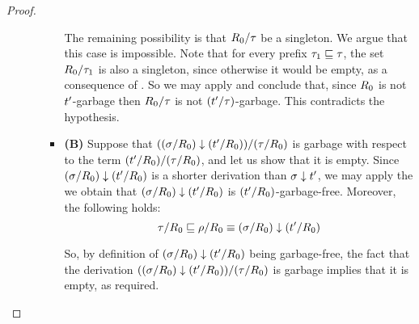 \begin{proof}
\begin{itemize}
\begin{enumerate}
\begin{itemize}
      The remaining possibility is that $R_0/\tau$ be a singleton.
      We argue that this case is impossible.
      Note that for every prefix $\tau_1 \sqsubseteq \tau$,
      the set $R_0/\tau_1$ is also a singleton,
      since otherwise it would be empty, as a consequence of .
      So we may apply  and conclude that,
      since $R_0$ is not $t'$-garbage
      then $R_0/\tau$ is not $(t'/\tau)$-garbage.
      This contradicts the hypothesis.
    \item {\bf (B)}
      Suppose that $((\sigma/R_0) \downarrow (t'/R_0))/(\tau/R_0)$ is garbage
      with respect to the term $(t'/R_0)/(\tau/R_0)$, and let us show that it is empty.
      Since $(\sigma/R_0) \downarrow (t'/R_0)$
      is a shorter derivation than $\sigma \downarrow t'$,
      we may apply the \ih we obtain that
      $(\sigma/R_0) \downarrow (t'/R_0)$ is $(t'/R_0)$-garbage-free.
      Moreover, the following holds:
      \[\tau/R_0 \sqsubseteq \rho/R_0 \equiv (\sigma/R_0) \downarrow (t'/R_0)\]

      So, by definition of $(\sigma/R_0) \downarrow (t'/R_0)$
      being garbage-free,
      the fact that
      the derivation
      $((\sigma/R_0) \downarrow (t'/R_0))/(\tau/R_0)$ is garbage
      implies that it is empty, as required.
    \end{itemize}
  \end{enumerate}
\end{itemize}
\end{proof}

